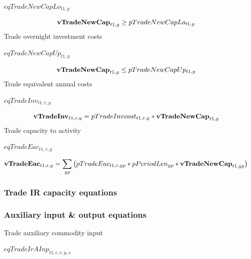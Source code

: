 \documentclass{article}
\begin{document}
$eqTradeNewCapLo_{t1,y}$





\begin{dmath}
{\bf vTradeNewCap}_{t1,y}  \ge  pTradeNewCapLo_{t1,y}
\end{dmath}
Trade overnight investment costs







$eqTradeNewCapUp_{t1,y}$





\begin{dmath}
{\bf vTradeNewCap}_{t1,y}  \le  pTradeNewCapUp_{t1,y}
\end{dmath}
Trade equivalent annual costs







$eqTradeInv_{t1,r,y}$





\begin{dmath}
{\bf vTradeInv}_{t1,r,y}  =  pTradeInvcost_{t1,r,y}*{\bf vTradeNewCap}_{t1,y}
\end{dmath}
Trade capacity to activity







$eqTradeEac_{t1,r,y}$





\begin{dmath}
{\bf vTradeEac}_{t1,r,y}  =  \sum_{yp}{\left(pTradeEac_{t1,r,yp}*pPeriodLen_{yp}*{\bf vTradeNewCap}_{t1,yp}\right)}
\end{dmath}
\subsubsection*{Trade IR capacity equations}
\subsubsection*{Auxiliary input \& output equations}
Trade auxiliary commodity input







$eqTradeIrAInp_{t1,c,r,y,s}$
\end{document}
